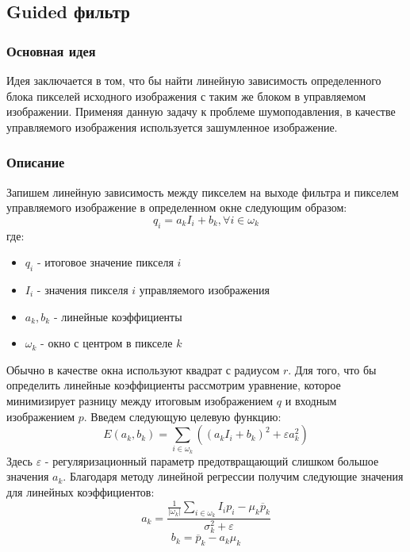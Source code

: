 \subsection{Guided фильтр}
\subsubsection{Основная идея}
Идея заключается в том, что бы найти линейную зависимость определенного блока пикселей исходного изображения с таким же блоком в управляемом изображении. Применяя данную задачу к проблеме шумоподавления, в качестве управляемого изображения используется зашумленное изображение.\cite{He}
\subsubsection{Описание}
Запишем линейную зависимость между пикселем на выходе фильтра и пикселем управляемого изображение в определенном окне следующим образом:
\begin{equation}\label{eq:Guided}
	q_i=a_kI_i+b_k, \forall i \in \omega_k
\end{equation} 
где: 
\begin{itemize}
	\item $q_i$ - итоговое значение пикселя $i$
	\item $I_i$ - значения пикселя $i$ управляемого изображения
	\item $a_k, b_k$ - линейные коэффициенты
	\item $\omega_k$ - окно с центром в пикселе $k$
\end{itemize}
Обычно в качестве окна используют квадрат с радиусом $r$.
Для того, что бы определить линейные коэффициенты рассмотрим уравнение, которое минимизирует разницу между итоговым изображением $q$ и входным изображением $p$. Введем следующую целевую функцию:
\begin{equation}
	E(a_k,b_k) = \sum_{i\in \omega_k}((a_kI_i+b_k)^2+\varepsilon a_k^2)
\end{equation}
Здесь $\varepsilon$ - регуляризационный параметр предотвращающий слишком большое значения $a_k$. Благодаря методу линейной регрессии получим следующие значения для линейных коэффициентов:
\begin{equation}
	a_k=\frac{\frac{1}{|\omega_k|}\sum_{i \in \omega_k}I_ip_i-\mu_k\overline{p}_k}{\sigma_k^2 + \varepsilon}
\end{equation}
\begin{equation}
b_k=\overline{p}_k-a_k\mu_k
\end{equation}
